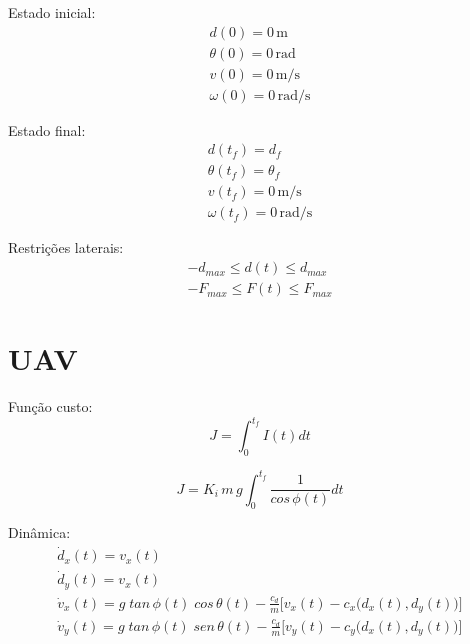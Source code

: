 \documentclass[10pt,a4paper]{article}
\begin{document}
	Estado inicial:
	\begin{equation}
		\begin{gathered}
			d(0) = 0 \, \text{m} \\
			\theta(0) = 0 \, \text{rad}\\
			v(0) = 0 \, \text{m/s}\\
			\omega(0) = 0 \, \text{rad/s}
		\end{gathered}
	\end{equation}
	
	Estado final:
	\begin{equation}
		\begin{gathered}
			d(t_f) = d_f \\
			\theta(t_f) = \theta_f\\
			v(t_f) = 0 \, \text{m/s}\\
			\omega(t_f) = 0 \, \text{rad/s}
		\end{gathered}
	\end{equation}
	
	Restrições laterais:
	\begin{equation}
		\begin{gathered}
			-d_{max} \leq d(t) \leq d_{max} \\
			-F_{max} \leq F(t) \leq F_{max}
		\end{gathered}
	\end{equation}
	
	
	\section{UAV}
	
	Função custo:
	\begin{equation}
		J = \int_{0}^{t_f} I(t) dt
	\end{equation}
	
	\begin{equation}
		J = K_i \, m \, g \int_{0}^{t_f} \frac{1}{cos \, \phi(t)} dt
	\end{equation}
	
	
	Dinâmica: 
	\begin{equation}
		\begin{gathered}
			\dot{d}_x(t) = v_x(t) \\
			\dot{d}_y(t) = v_x(t) \\
			\dot{v}_x(t) = g \; tan \, \phi(t) \; cos \, \theta(t) - \frac{c_d}{m} \Big[ v_x(t) - c_x \big( d_x(t), d_y(t) \big) \Big] \\
			\dot{v}_y(t) = g \; tan \, \phi(t) \; sen \, \theta(t) - \frac{c_d}{m} \Big[ v_y(t) - c_y \big( d_x(t), d_y(t) \big) \Big] 
		\end{gathered}
	\end{equation}
	
\end{document}
